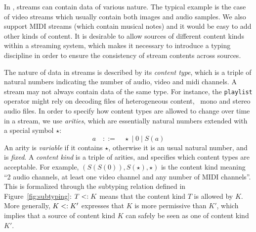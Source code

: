 


In \liquidsoap{}, streams can contain data of various nature. The typical
example is the case of video streams which usually contain both images and
audio samples. We also support MIDI streams (which contain musical notes)
and it would be easy to add other kinds of content.
It is desirable to allow sources of different
content kinds within a streaming system, which makes it necessary to
introduce a typing discipline in order to ensure 
the consistency of stream contents across sources.

The nature of data in streams is described by its \emph{content type}, which is
a triple of natural numbers indicating the number of audio, video and midi
channels.  A stream may not always contain data of the same type.  For instance,
the \texttt{playlist} operator might rely on decoding files of heterogeneous
content, \eg\ mono and stereo audio files.  In order to specify how content
types are allowed to change over time in a stream, we use \emph{arities}, which
are essentially natural numbers extended with a special symbol $\star$:
\[
a\quad ::=\quad \star \;|\; 0 \;|\; S(a)
\]
An arity is \emph{variable} if it contains $\star$, otherwise it is an usual
natural number, and is \emph{fixed}. A \emph{content kind} is a triple of
arities, and specifies which content types are acceptable. For example,
$(S(S(0)),S(\star),\star)$ is the content kind meaning ``2 audio channels, at
least one video channel and any number of MIDI channels''.
This is formalized through the subtyping relation defined in
Figure~\ref{fig:subtyping}: $T<: K$ means
that the content kind $T$ is allowed by $K$. More generally,
$K <: K'$ expresses that $K$ is more permissive than $K'$,
which implies that a source of content kind $K$ can safely be seen
as one of content kind $K'$.

